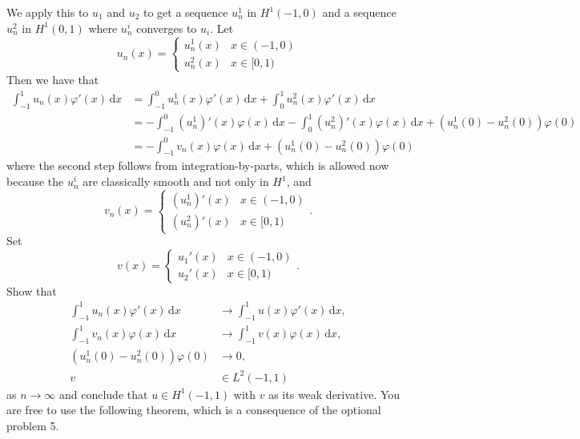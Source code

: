 \documentclass{article}
\theoremstyle{definition}
\theoremstyle{plain}
\renewcommand{\d}{\mathrm d}
\begin{document}
We apply this to $u_1$ and $u_2$ to get a sequence $u_n^1$ in $H^1(-1,0)$ and a sequence $u_n^2$ in $H^1(0,1)$ where $u_n^i$ converges to $u_i$.
Let 
\begin{equation}
  u_n(x) = \begin{cases}
    u_n^1(x) & x \in (-1,0) \\
    u_n^2(x) & x \in [0,1)
  \end{cases}
\end{equation}
Then we have that 
\begin{align}
  \int_{-1}^1u_n(x)\varphi'(x)\,\d x &= \int_{-1}^0u_n^1(x)\varphi'(x)\,\d x + \int_0^1u_n^2(x)\varphi'(x)\,\d x \\
                                     &= -\int_{-1}^0 (u_n^1)'(x)\varphi(x)\,\d x - \int_0^1(u_n^2)'(x)\varphi(x)\,\d x + (u_n^1(0) - u_n^2(0))\varphi(0) \\
                                     &= - \int_{-1}^0 v_n(x)\varphi(x)\,\d x + (u_n^1(0) - u_n^2(0))\varphi(0)
\end{align}
where the second step follows from integration-by-parts, which is allowed now because the $u_n^i$ are classically smooth and not only in $H^1$, and 
\begin{equation}
  v_n(x) = \begin{cases}
    (u_n^1)'(x) & x \in (-1,0) \\
    (u_n^2)'(x) & x \in [0,1)
  \end{cases}.
\end{equation}
Set 
\begin{equation}
  v(x) = \begin{cases}
    u_1'(x) & x \in (-1,0) \\
    u_2'(x) & x \in [0,1)
  \end{cases}.
\end{equation}
Show that 
\begin{align}
  \int_{-1}^1u_n(x)\varphi'(x)\,\d x & \to \int_{-1}^1 u(x) \varphi'(x)\,\d x, \\
  \int_{-1}^1v_n(x)\varphi(x)\,\d x & \to \int_{-1}^1 v(x)\varphi(x)\,\d x, \\
  (u_n^1(0) - u_n^2(0))\varphi(0) & \to 0, \\
  v & \in L^2(-1,1)
\end{align}
as $n \to \infty$ and conclude that $u \in H^1(-1,1)$ with $v$ as its weak derivative.
You are free to use the following theorem, which is a consequence of the optional problem 5.
\end{document}
